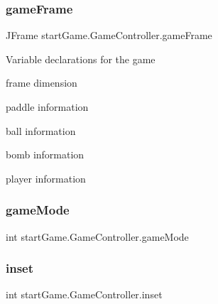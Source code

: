 \hypertarget{classstart_game_1_1_game_controller_adc48b19833b682baaa2e189362db5456}{}\label{classstart_game_1_1_game_controller_adc48b19833b682baaa2e189362db5456} 
\subsubsection{\texorpdfstring{game\+Frame}{gameFrame}}
{\footnotesize\ttfamily J\+Frame start\+Game.\+Game\+Controller.\+game\+Frame\hspace{0.3cm}{\ttfamily [private]}}

Variable declarations for the game
\begin{DoxyItemize}
\item frame dimension
\item paddle information
\item ball information
\item bomb information
\item player information 
\end{DoxyItemize}\hypertarget{classstart_game_1_1_game_controller_af029ba3e799fe940deb010e575287f55}{}\label{classstart_game_1_1_game_controller_af029ba3e799fe940deb010e575287f55} 
\subsubsection{\texorpdfstring{game\+Mode}{gameMode}}
{\footnotesize\ttfamily int start\+Game.\+Game\+Controller.\+game\+Mode\hspace{0.3cm}{\ttfamily [private]}}

\hypertarget{classstart_game_1_1_game_controller_a5195c030f589da53f78a185e31a5dc9a}{}\label{classstart_game_1_1_game_controller_a5195c030f589da53f78a185e31a5dc9a} 
\subsubsection{\texorpdfstring{inset}{inset}}
{\footnotesize\ttfamily int start\+Game.\+Game\+Controller.\+inset\hspace{0.3cm}{\ttfamily [private]}}

